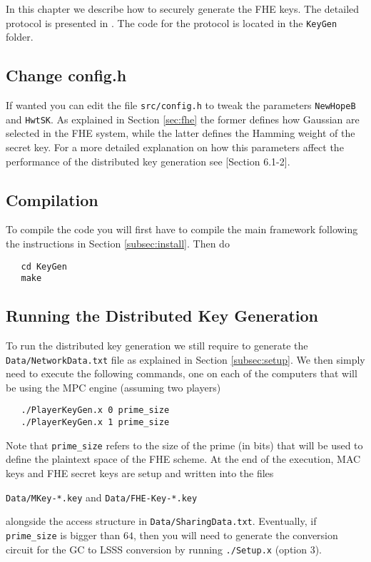 \label{sec:keygen}
In this chapter we describe how to securely generate
the FHE keys.
The detailed protocol is presented in \cite{SPDZKG}.
The code for the protocol is located in the \verb+KeyGen+ folder.

\subsection{Change config.h}
If wanted you can edit the file \verb+src/config.h+ to
tweak the parameters \verb+NewHopeB+ and \verb+HwtSK+.
As explained in Section \ref{sec:fhe} the former defines
how Gaussian are selected in the FHE system, while the
latter defines the Hamming weight of the secret key.
For a more detailed explanation on how this parameters
affect the performance of the distributed key generation
see \cite{SPDZKG}[Section 6.1-2].

\subsection{Compilation}
To compile the code you will first have to compile the main framework
following the instructions in Section \ref{subsec:install}.
Then do
\begin{verbatim}
   cd KeyGen
   make
\end{verbatim}

\subsection{Running the Distributed Key Generation}
To run the distributed key generation we still require
to generate the \verb+Data/NetworkData.txt+ file as 
explained in Section \ref{subsec:setup}.
We then simply need to execute the following commands, 
one on each of the computers that will be using the 
MPC engine (assuming two players)
\begin{verbatim}
   ./PlayerKeyGen.x 0 prime_size
   ./PlayerKeyGen.x 1 prime_size
\end{verbatim}
Note that \verb+prime_size+ refers to the size of the prime
(in bits) that will be used to define the plaintext space
of the FHE scheme.
At the end of the execution, MAC keys and FHE secret keys are
setup and written into the files
\begin{center}
\verb+Data/MKey-*.key+ and \verb+Data/FHE-Key-*.key+
\end{center}
alongside the access structure in \verb+Data/SharingData.txt+.
Eventually, if \verb+prime_size+ is bigger than $64$, then
you will need to generate the conversion circuit for the
GC to LSSS conversion by running \verb+./Setup.x+
(option 3).

